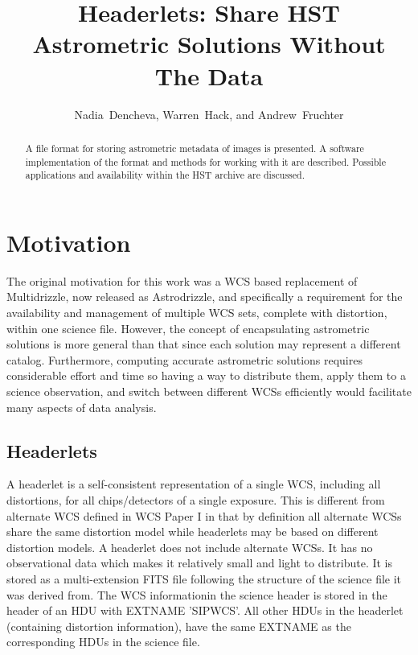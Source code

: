 
\resetcounters




\title{Headerlets: Share HST Astrometric Solutions Without The Data}
\author{Nadia~Dencheva, Warren~Hack, and Andrew~Fruchter
}


\begin{abstract}
A file format for storing astrometric metadata of images is presented. A software implementation of the format and methods for working with it are described. Possible applications and availability within the HST archive are discussed.
\end{abstract}

\section{Motivation}
The original motivation for this work was a WCS based replacement of Multidrizzle, now released as Astrodrizzle, and specifically a requirement for the availability and management of multiple WCS sets, complete with distortion, within one science file. However, the concept of encapsulating astrometric solutions is more general than that since each solution may represent a different catalog. Furthermore, computing accurate astrometric solutions requires considerable effort and time so having a way to distribute them, apply them to a science observation, and switch between different WCSs efficiently would facilitate many aspects of data analysis.

\subsection{Headerlets}
A headerlet is a self-consistent representation of a single WCS, including all distortions, for all chips/detectors of a single exposure. This is different from alternate WCS defined in WCS Paper I \citep{greisen_2002} in that by definition all alternate WCSs share the same distortion model while headerlets may be based on different distortion models. A headerlet does not include alternate WCSs. It has no observational data which makes it relatively small and light to distribute. It is stored as a multi-extension FITS file following the structure of the science file it was derived from. The WCS informationin the science header is stored in the header of an HDU with EXTNAME 'SIPWCS'. All other HDUs in the headerlet (containing distortion information), have the same EXTNAME as the corresponding HDUs in the science file.

